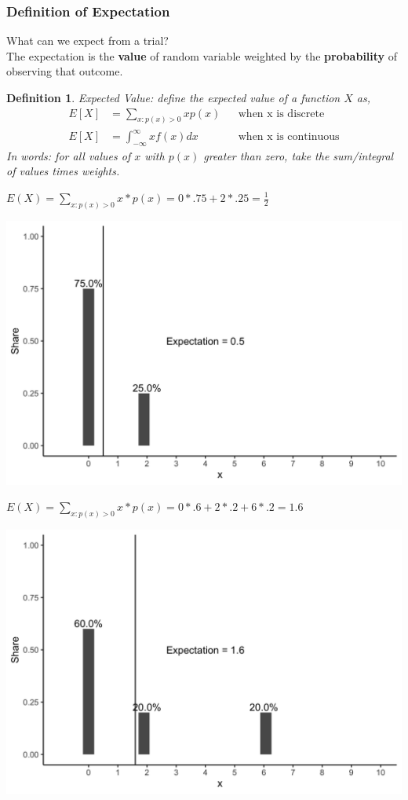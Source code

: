 \documentclass[aspectratio=169, handout]{beamer}
\newtheorem{defn}{Definition}
\numberwithin{equation}{section}
\begin{document}
\begin{frame}
\frametitle{Definition of Expectation}

What can we \alert{expect} from a trial? \pause \\

The expectation is the \textbf{value} of random variable weighted by the \textbf{probability} of observing that outcome.\pause

\begin{defn} 
Expected Value: define the expected value of a function $X$ as, 
\begin{align*}
E[X] &=  \sum_{x:p(x)>0} x p(x) &&\text{when x is discrete} \\ 
E[X] &=  \int_{-\infty}^{\infty} x f(x) dx &&\text{when x is continuous}
\end{align*}
In words: for all values of $x$ with $p(x)$ greater than zero, take the sum/integral of values times weights.
\end{defn} 

\end{frame}




\begin{frame}{$E(X)= \sum_{x:p(x)>0} x *p(x) =0*.75+2*.25= \frac{1}{2}$}

\begin{center}
 \includegraphics[width=4 in]{plot1.png}
\end{center}

\end{frame}


\begin{frame}{$E(X)= \sum_{x:p(x)>0} x *p(x) =0*.6+2*.2+6*.2= 1.6$}

\begin{center}
\includegraphics[width=4 in]{plot2.png}
\end{center}

\end{frame}
\end{document}

